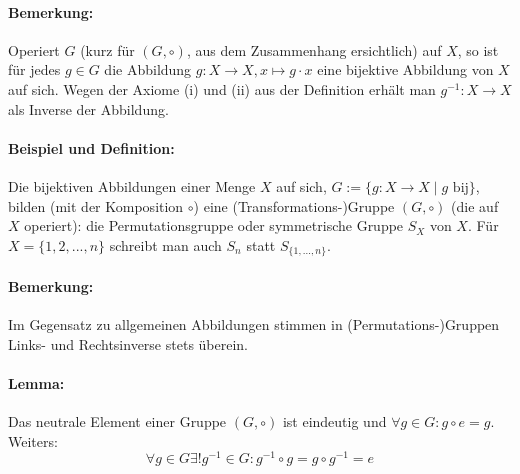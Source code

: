 \documentclass[12pt,a4paper,parskip=half-,DIV=15]{scrartcl}
\begin{document}
\paragraph{Bemerkung:} Operiert $G$ (kurz für $(G,\circ )$, aus dem Zusammenhang ersichtlich) auf $X$, so ist für jedes $g\in G$ die Abbildung $g:X\to X, x\mapsto g\cdot x$ eine bijektive Abbildung von $X$ auf sich. Wegen der Axiome (i) und (ii) aus der Definition erhält man $g^{-1}: X\to X$ als Inverse der Abbildung.
\paragraph{Beispiel und Definition:} Die bijektiven Abbildungen einer Menge $X$ auf sich, $G:= \{g:X\to X\mid g \text{ bij}\}$, bilden (mit der Komposition $\circ$) eine (Transformations-)Gruppe $(G,\circ )$ (die auf $X$ operiert): die Permutationsgruppe oder symmetrische Gruppe $S_X$ von $X$. Für $X=\{1,2,...,n\}$ schreibt man auch $S_n$ statt $S_{\{1,...,n\}}$.
\paragraph{Bemerkung:} Im Gegensatz zu allgemeinen Abbildungen stimmen in (Permutations-)Gruppen Links- und Rechtsinverse stets überein.
\paragraph{Lemma:} Das neutrale Element einer Gruppe $(G,\circ )$ ist eindeutig und $\forall g\in G: g\circ e = g$. Weiters: \begin{equation*}\forall g\in G \exists ! g^{-1} \in G: g^{-1}\circ g = g \circ g^{-1} = e\end{equation*}
\end{document}
